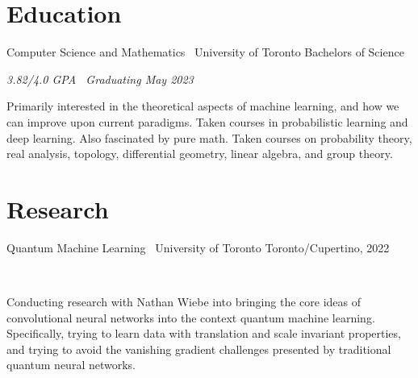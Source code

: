 \documentclass[]{style}
\begin{document}
\section{Education}

\begin{entrylist}


\entry
{Computer Science and Mathematics \ {\normalfont University of Toronto}}
{Bachelors of Science}
{\emph{3.82/4.0 GPA \ Graduating May 2023}
~ \vspace{1mm}

Primarily interested in the theoretical aspects of machine learning, and how we can improve upon current paradigms. Taken courses in probabilistic learning and deep learning. Also fascinated by pure math. Taken courses on probability theory, real analysis, topology, differential geometry, linear algebra, and group theory. }


\end{entrylist}


\section{Research}

\begin{entrylist}


\vspace{2mm}

\entry
{Quantum Machine Learning \ {\normalfont University of Toronto}}
{Toronto/Cupertino, 2022}
{ ~ \vspace{-2.5mm}

Conducting research with Nathan Wiebe into bringing the core ideas of convolutional neural networks into the context quantum machine learning. Specifically, trying to learn data with translation and scale invariant properties, and trying to avoid the vanishing gradient challenges presented by traditional quantum neural networks.
}

\end{entrylist}
\end{document}
